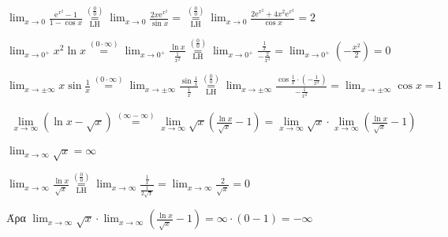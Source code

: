 \begin{example}
  $ \lim_{x \to 0} \frac{\mathrm{e}^{x^{2}} -1}{1- \cos{x}}
  \overset{\left(\frac{0}{0}\right)}{\underset{\mathrm{LH}}{=}} \lim_{x \to 0}
  \frac{2x \mathrm{e}^{x^{2}}}{\sin{x}} =
  \overset{\left(\frac{0}{0}\right)}{\underset{\mathrm{LH}}{=}} \lim_{x \to 0}
  \frac{2 \mathrm{e}^{x^{2}}+4x^{2} \mathrm{e}^{x^{2}}}{\cos{x}} = 2 $  
\end{example}

\begin{example}
  $ \lim_{x \to 0^{+}} x^{2} \ln{x} \overset{(0\cdot \infty)}{=} \lim_{x \to 0^{+}} 
  \frac{\ln{x}}{\frac{1}{x^{2}}}
  \overset{\left(\frac{0}{0}\right)}{\underset{\mathrm{LH}}{=}}
  \lim_{x \to 0^{+}} \frac{\frac{1}{x}
  }{- \frac{2}{x^{3}}} = \lim_{x \to 0^{+}} \left(-\frac{x^{2}}{2}\right) = 0 $
\end{example}

\begin{example}
  $ \lim_{x \to \pm \infty} x \sin{\frac{1}{x}} \overset{(0\cdot \infty)}{=}
  \lim_{x \to \pm \infty} \frac{\sin{\frac{1}{ x}}}{\frac{1}{x}}
  \overset{\left(\frac{0}{0}\right)}{\underset{\mathrm{LH}}{=}} \lim_{x \to \pm
  \infty} \frac{\cos{\frac{1}{x}} \cdot (- \frac{1}{x^{2}})}{- \frac{1}{x^{2}}} =
  \lim_{x \to \pm \infty} \cos{x} = 1 $
\end{example}

\begin{example}
  \begin{align*}
    \lim_{x \to \infty} (\ln{x} - \sqrt{x}) \overset{(\infty- \infty)}{=} \lim_{x \to
    \infty} \sqrt{x} \left(\frac{\ln{x}}{\sqrt{x}}-1\right) = 
    \lim_{x \to \infty} \sqrt{x} \cdot
    \lim_{x \to \infty} \left(\frac{\ln{x}}{\sqrt{x}} - 1\right)
  \end{align*}
  \begin{myitemize}
    \item $ \lim_{x \to \infty} \sqrt{x} = \infty $
    \item $ \lim_{x \to \infty} \frac{\ln{x}}{\sqrt{x}}
      \overset{\left(\frac{0}{0}\right)}{\underset{\mathrm{LH}}{=}} \lim_{x \to \infty}
      \frac{\frac{1}{x}}{\frac{1}{2 \sqrt{x}}} = \lim_{x \to \infty}
      \frac{2}{\sqrt{x}} = 0 $
  \end{myitemize}
  Άρα 
  $ \lim_{x \to \infty} \sqrt{x} \cdot \lim_{x \to \infty}
  \left(\frac{\ln{x}}{\sqrt{x}} -1\right) = \infty\cdot (0-1) = - \infty $
\end{example}

